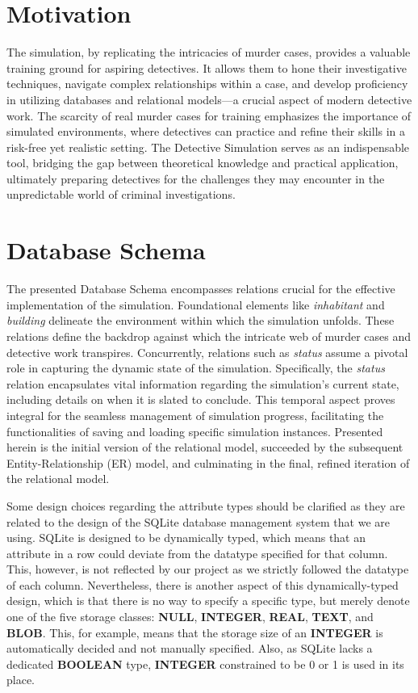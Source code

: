 \documentclass{article}
\begin{document}
\section{Motivation}
The simulation, by replicating the intricacies of murder cases, provides a valuable training ground for aspiring detectives. It allows them to hone their investigative techniques, navigate complex relationships within a case, and develop proficiency in utilizing databases and relational models—a crucial aspect of modern detective work. The scarcity of real murder cases for training emphasizes the importance of simulated environments, where detectives can practice and refine their skills in a risk-free yet realistic setting. The Detective Simulation serves as an indispensable tool, bridging the gap between theoretical knowledge and practical application, ultimately preparing detectives for the challenges they may encounter in the unpredictable world of criminal investigations.

\section{Database Schema}

The presented Database Schema encompasses relations crucial for the effective implementation of the simulation. Foundational elements like \textit{inhabitant} and \textit{building} delineate the environment within which the simulation unfolds. These relations define the backdrop against which the intricate web of murder cases and detective work transpires. Concurrently, relations such as \textit{status} assume a pivotal role in capturing the dynamic state of the simulation. Specifically, the \textit{status} relation encapsulates vital information regarding the simulation's current state, including details on when it is slated to conclude. This temporal aspect proves integral for the seamless management of simulation progress, facilitating the functionalities of saving and loading specific simulation instances. Presented herein is the initial version of the relational model, succeeded by the subsequent Entity-Relationship (ER) model, and culminating in the final, refined iteration of the relational model.

Some design choices regarding the attribute types should be clarified as they are related to the design of the SQLite database management system that we are using. SQLite is designed to be dynamically typed, which means that an attribute in a row could deviate from the datatype specified for that column.\cite{sqlite_datatypes} This, however, is not reflected by our project as we strictly followed the datatype of each column. Nevertheless, there is another aspect of this dynamically-typed design, which is that there is no way to specify a specific type, but merely denote one of the five storage classes: \textbf{NULL}, \textbf{INTEGER}, \textbf{REAL}, \textbf{TEXT}, and \textbf{BLOB}. This, for example, means that the storage size of an \textbf{INTEGER} is automatically decided and not manually specified. Also, as SQLite lacks a dedicated \textbf{BOOLEAN} type, \textbf{INTEGER} constrained to be 0 or 1 is used in its place.
\end{document}
